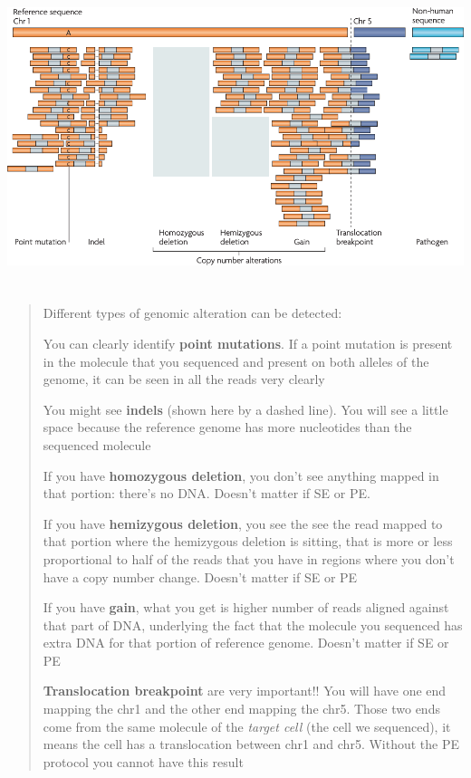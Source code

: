 \includegraphics[width=6.16003in,height=3.4875in]{image13.png}

\begin{quote}
Different types of genomic alteration can be detected:

You can clearly identify \textbf{point mutations}. If a point mutation
is present in the molecule that you sequenced and present on both
alleles of the genome, it can be seen in all the reads very clearly

You might see \textbf{indels} (shown here by a dashed line). You will
see a little space because the reference genome has more nucleotides
than the sequenced molecule

If you have \textbf{homozygous deletion}, you don't see anything mapped
in that portion: there's no DNA. Doesn't matter if SE or PE.

If you have \textbf{hemizygous deletion}, you see the see the read
mapped to that portion where the hemizygous deletion is sitting, that is
more or less proportional to half of the reads that you have in regions
where you don't have a copy number change. Doesn't matter if SE or PE

If you have \textbf{gain}, what you get is higher number of reads
aligned against that part of DNA, underlying the fact that the molecule
you sequenced has extra DNA for that portion of reference genome.
Doesn't matter if SE or PE

\textbf{Translocation breakpoint} are very important!! You will have one
end mapping the chr1 and the other end mapping the chr5. Those two ends
come from the same molecule of the \emph{target cell} (the cell we
sequenced), it means the cell has a translocation between chr1 and chr5.
Without the PE protocol you cannot have this result
\end{quote}

